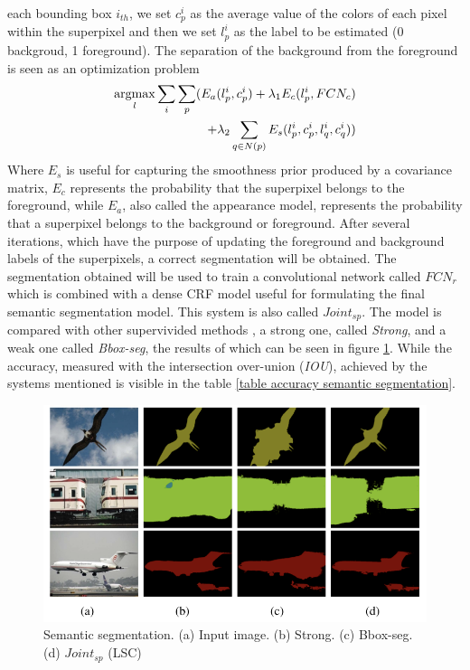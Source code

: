each bounding box $ i_{th} $, we set $ c_p^i $ as the average value of the colors of each 
pixel within the superpixel and then we set $ l_p^i $ as the label to be estimated (0 
backgroud, 1 foreground). The separation of the background from the 
foreground is seen as an optimization problem
\begin{equation}
    \begin{split}
        \operatorname*{argmax}\limits_{l} \sum_i\sum_p(E_a(l_p^i,c_p^i) + \lambda_1E_c(l_p^i, FCN_c)\\
        + \lambda_2\sum_{q\in N(p)}E_s(l_p^i,c_p^i,l_q^i,c_q^i)) 
    \end{split}
\end{equation}
Where $ E_s $ is useful for capturing the smoothness prior produced by a covariance 
matrix, $ E_c $ represents the probability that the superpixel belongs 
to the foreground, while $ E_a $, also called the appearance model, represents 
the probability that a superpixel belongs to the background or foreground. 
After several iterations, which have the purpose of updating the foreground 
and background labels of the superpixels, a correct segmentation will be 
obtained. The segmentation obtained will be used to train a convolutional 
network called $ FCN_r $ which is combined with a dense CRF model useful for 
formulating the final semantic segmentation model. This system is also 
called $ Joint_{sp} $. The model is compared with other supervivided methods \cite{0781426541}, 
a strong one, called \emph{Strong}, and a weak one called \emph{Bbox-seg}, the results of 
which can be seen in figure \ref{fig: semanticSegmentation}. While the accuracy, measured with the intersection 
over-union (\emph{IOU}), achieved by the systems mentioned is visible in the 
table \ref{table accuracy semantic segmentation}.

\begin{figure}[htbp]
    \centering
    \includegraphics[width = 0.7 \linewidth]{images/paper2/segmentationAlgo.png}
    \centering
    \caption{Semantic segmentation. (a) Input image. (b) Strong. (c) Bbox-seg. (d) $ Joint_{sp} $ (LSC) }
    \label{fig: semanticSegmentation}
\end{figure}

